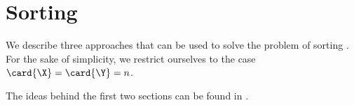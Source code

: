 \chapter{Sorting \XY}

We describe three approaches that can be used to solve the problem
of sorting \XY. For the sake of simplicity,
we restrict ourselves to the case $\card{\X} = \card{\Y} = n$.

The ideas behind the first two sections can be found in \citet*{harper:1975}.
